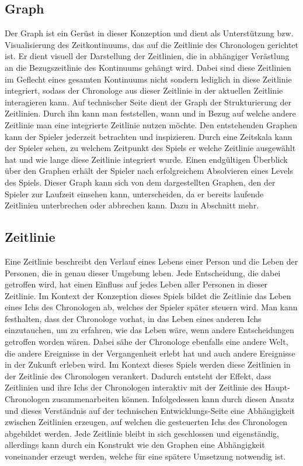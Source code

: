 \subsection{Graph}
Der Graph ist ein Gerüst in dieser Konzeption und dient als Unterstützung bzw. Visualisierung des Zeitkontinuums, das auf die Zeitlinie des Chronologen gerichtet ist. Er dient visuell der Darstellung der  Zeitlinien, die in abhängiger Verästlung an die Bezugszeitlinie des Kontinuums gehängt wird. Dabei sind diese Zeitlinien im Geflecht eines gesamten Kontinuums nicht  sondern lediglich in diese Zeitlinie integriert, sodass der Chronologe aus dieser Zeitlinie in der aktuellen Zeitlinie interagieren kann. Auf technischer Seite dient der Graph der Strukturierung der Zeitlinien. Durch ihn kann man feststellen, wann und in Bezug auf welche andere Zeitlinie man eine integrierte Zeitlinie nutzen möchte. Den entstehenden Graphen kann der Spieler jederzeit betrachten und inspizieren. Durch eine Zeitskala kann der Spieler sehen, zu welchem Zeitpunkt des Spiels er welche Zeitlinie ausgewählt hat und wie lange diese Zeitlinie integriert wurde. Einen endgültigen Überblick über den Graphen erhält der Spieler nach erfolgreichem Absolvieren eines Levels des Spiels. Dieser Graph kann sich von dem dargestellten Graphen, den der Spieler zur Laufzeit einsehen kann, unterscheiden, da er bereits laufende Zeitlinien unterbrechen oder abbrechen kann. Dazu in Abschnitt  mehr.

\subsection{Zeitlinie}
Eine Zeitlinie beschreibt den Verlauf eines Lebens einer Person und die Leben der Personen, die in genau dieser Umgebung leben. Jede Entscheidung, die dabei getroffen wird, hat einen Einfluss auf jedes Leben aller Personen in dieser Zeitlinie. Im Kontext der Konzeption dieses Spiels bildet die Zeitlinie das Leben eines Ichs des Chronologen ab, welches der Spieler später steuern wird. Man kann festhalten, dass der Chronologe vorhat, in das Leben eines anderen Ichs einzutauchen, um zu erfahren, wie das Leben wäre, wenn andere Entscheidungen getroffen worden wären. Dabei sähe der Chronologe ebenfalls eine andere Welt, die andere Ereignisse in der Vergangenheit erlebt hat und auch andere Ereignisse in der Zukunft erleben wird. Im Kontext dieses Spiels werden diese Zeitlinien in der Zeitlinie des Chronologen verankert. Dadurch entsteht der Effekt, dass Zeitlinien und ihre Ichs der Chronologen interaktiv mit der Zeitlinie des Haupt-Chronologen zusammenarbeiten können. Infolgedessen kann durch diesen Ansatz und dieses Verständnis auf der technischen Entwicklungs-Seite eine Abhängigkeit zwischen Zeitlinien erzeugen, auf welchen die gesteuerten Ichs des Chronologen abgebildet werden. Jede Zeitlinie bleibt in sich geschlossen und eigenständig, allerdings kann durch ein Konstrukt wie den Graphen eine Abhängigkeit voneinander erzeugt werden, welche für eine spätere Umsetzung notwendig ist.

